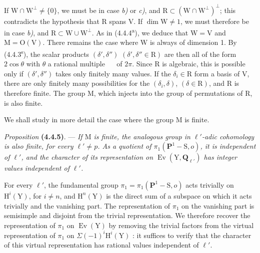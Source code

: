 \documentclass[11pt,leqno]{article}
\newcommand{\Page}[1]{\ifvmode\noindent\else\unskip\ \fi{\footnotesize\textcolor{gray}{[p.\,#1]}}\ \ignorespaces}
\begin{document}
If \(\mathrm{W}\cap\mathrm{W}^{\perp}\neq\{0\}\), we must be in case \textit{b)} or \textit{c)}, and \(\mathrm{R}\subset(\mathrm{W}\cap\mathrm{W}^{\perp})^{\perp}\); this contradicts the hypothesis that \(\mathrm{R}\) spans \(\mathrm{V}\). If \(\dim\mathrm{W}\neq1\), we must therefore be in case \textit{b)}, and \(\mathrm{R}\subset\mathrm{W}\cup\mathrm{W}^{\perp}\). As in (4.4.4\textsuperscript{a}), we deduce that \(\mathrm{W}=\mathrm{V}\) and \(\mathrm{M}=\mathrm{O}(\mathrm{V})\). There remains the case where \(\mathrm{W}\) is always of dimension 1. By (4.4.3\textsuperscript{s}), the scalar products \((\delta',\delta'')\) \((\delta',\delta''\in\mathrm{R})\) are then all of the form \(2\cos\theta\) with \(\theta\) a rational multiple
\Page{229}
of \(2\pi\). Since \(\mathrm{R}\) is algebraic, this is possible only if \((\delta',\delta'')\) takes only finitely many values. If the \(\delta_i\in\mathrm{R}\) form a basis of \(\mathrm{V}\), there are only finitely many possibilities for the \((\delta_i,\delta)\), \((\delta\in\mathrm{R})\), and \(\mathrm{R}\) is therefore finite. The group \(\mathrm{M}\), which injects into the group of permutations of \(\mathrm{R}\), is also finite.

We shall study in more detail the case where the group \(\mathrm{M}\) is finite.

\textit{Proposition} \textbf{(4.4.5)}. — \textit{If \(\mathrm{M}\) is finite, the analogous group in \(\ell'\)-adic cohomology is also finite, for every \(\ell'\neq p\). As a quotient of \(\pi_1(\mathbf{P}^1-\mathrm{S},o)\), it is independent of \(\ell'\), and the character of its representation on \(\operatorname{Ev}(\mathrm{Y},\mathbf{Q}_{\ell'})\) has integer values independent of \(\ell'\).}

For every \(\ell'\), the fundamental group \(\pi_1=\pi_1(\mathbf{P}^1-\mathrm{S},o)\) acts trivially on \(\mathrm{H}^i(\mathrm{Y})\), for \(i\neq n\), and \(\mathrm{H}^n(\mathrm{Y})\) is the direct sum of a subspace on which it acts trivially and the vanishing part. The representation of \(\pi_1\) on the vanishing part is semisimple and disjoint from the trivial representation. We therefore recover the representation of \(\pi_1\) on \(\operatorname{Ev}(\mathrm{Y})\) by removing the trivial factors from the virtual representation of \(\pi_1\) on \(\Sigma(-1)^i\mathrm{H}^i(\mathrm{Y})\) : it suffices to verify that the character of this virtual representation has rational values independent of \(\ell'\).
\end{document}
